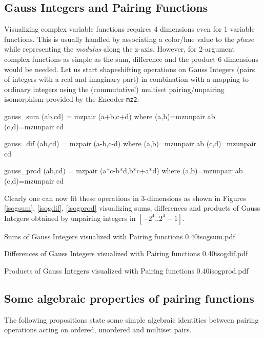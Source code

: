 \documentclass[]{INCLUDES/llncs}
\begin{document}
\subsection{Gauss Integers and Pairing Functions}
Visualizing complex variable functions requires 4 dimensions even for
1-variable functions. This is usually handled by associating a color/hue value
to the {\em phase} while representing the {\em modulus} along the z-axis.
However, for 2-argument complex functions as simple as the sum, difference and
the product 6 dimensions would be needed.
Let us start shapeshifting operations on Gauss Integers
(pairs of integers with a real and imaginary part) in combination with a
mapping to ordinary integers using the  (commutative!) multiset
pairing/unpairing isomorphism provided by the Encoder {\tt mz2}:
\begin{code}
gauss_sum (ab,cd) = mzpair (a+b,c+d) where
  (a,b)=mzunpair ab
  (c,d)=mzunpair cd

gauss_dif (ab,cd) = mzpair (a-b,c-d) where
  (a,b)=mzunpair ab
  (c,d)=mzunpair cd
  
gauss_prod (ab,cd) = mzpair (a*c-b*d,b*c+a*d) where
  (a,b)=mzunpair ab
  (c,d)=mzunpair cd
\end{code}
Clearly one can now fit these operations in 3-dimensions as shown
in Figures \ref{isogsum}, \ref{isogdif}, \ref{isogprod} visualizing
sums, differences and products of Gauss Integers obtained by
unpairing integers in $[-2^4..2^4-1]$.

{Sums of Gauss Integers visualized with Pairing functions}
{0.40}{isogsum.pdf}

{Differences of Gauss Integers visualized with Pairing functions}
{0.40}{isogdif.pdf}

{Products of Gauss Integers visualized with Pairing functions}
{0.40}{isogprod.pdf}

\subsection{Some algebraic properties of pairing functions}
The following propositions state some simple
algebraic identities between pairing operations acting on ordered, unordered and multiset pairs.
\end{document}
